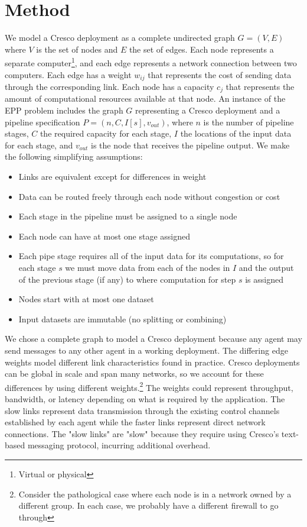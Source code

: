 \documentclass{acmart}
\newcommand{\eppInstance}{\ensuremath{n,C,I[s],v_{out}}}
\begin{document}
    \section{Method}
	We model a Cresco deployment as a complete undirected graph $G=(V,E)$ where $V$ is the set of nodes and $E$ the set of edges. Each node represents a separate computer\footnote{Virtual or physical}, and each edge represents a network connection between two computers. Each edge has a weight $w_{ij}$ that represents the cost of sending data through the corresponding link. Each node has a capacity $c_{j}$ that represents the amount of computational resources available at that node. An instance of the EPP problem includes the graph $G$ representing a Cresco deployment and a pipeline specification $P = (\eppInstance)$, where  $n$ is the number of pipeline stages, $C$ the required capacity for each stage, $I$ the locations of the input data for each stage, and $v_{out}$ is the node that receives the pipeline output. We make the following simplifying assumptions:
	\begin{itemize}
		\item Links are equivalent except for differences in weight
		\item Data can be routed freely through each node without congestion or cost
		\item Each stage in the pipeline must be assigned to a single node
		\item Each node can have at most one stage assigned
		\item Each pipe stage requires all of the input data for its computations, so for each stage $s$ we must move data from each of the nodes in $I$ and the output of the previous stage (if any) to where computation for step $s$ is assigned
		\item Nodes start with at most one dataset
		\item Input datasets are immutable (no splitting or combining)
	\end{itemize}
	
	We chose a complete graph to model a Cresco deployment because any agent may send messages to any other agent in a working deployment. The differing edge weights model different link characteristics found in practice. Cresco deployments can be global in scale and span many networks, so we account for these differences by using different weights.\footnote{Consider the pathological case where each node is in a network owned by a different group. In each case, we probably have a different firewall to go through} The weights could represent throughput, bandwidth, or latency depending on what is required by the application. The slow links represent data transmission through the existing control channels established by each agent while the faster links represent direct network connections. The "slow links" are "slow" because they require using Cresco's text-based messaging protocol, incurring additional overhead.
	
\end{document}
